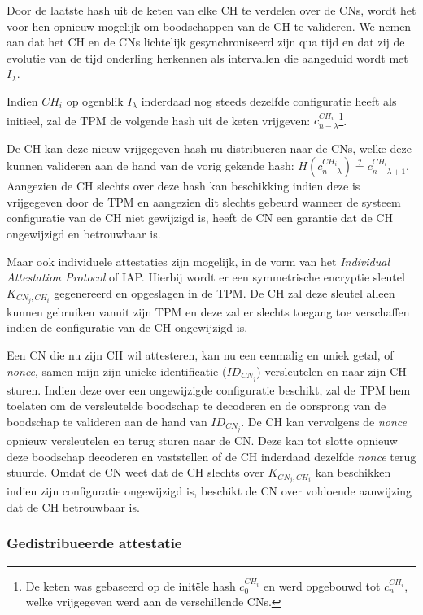 Door de laatste hash uit de keten van elke CH te verdelen over de CNs, wordt
het voor hen opnieuw mogelijk om boodschappen van de CH te valideren. We nemen
aan dat het CH en de CNs lichtelijk gesynchroniseerd zijn qua tijd en dat zij
de evolutie van de tijd onderling herkennen als intervallen die aangeduid wordt
met $I_\lambda$.

Indien $CH_i$ op ogenblik $I_\lambda$ inderdaad nog steeds dezelfde
configuratie heeft als initieel, zal de TPM de volgende hash uit de keten
vrijgeven: $c_{n-\lambda}^{CH_i}$\footnote{De keten was gebaseerd op de
init\"ele hash $c_0^{CH_i}$ en werd opgebouwd tot $c_n^{CH_i}$, welke
vrijgegeven werd aan de verschillende CNs.}.

De CH kan deze nieuw vrijgegeven hash nu distribueren naar de CNs, welke deze
kunnen valideren aan de hand van de vorig gekende hash:
$H(c_{n-\lambda}^{CH_i}) \overset{?}{=} c_{n-\lambda+1}^{CH_i}$. Aangezien de
CH slechts over deze hash kan beschikking indien deze is vrijgegeven door de
TPM en aangezien dit slechts gebeurd wanneer de systeem configuratie van de CH
niet gewijzigd is, heeft de CN een garantie dat de CH ongewijzigd en
betrouwbaar is.

Maar ook individuele attestaties zijn mogelijk, in de vorm van het
\emph{Individual Attestation Protocol} of IAP. Hierbij wordt er een
symmetrische encryptie sleutel $K_{CN_j,CH_i}$ gegenereerd en opgeslagen in de
TPM. De CH zal deze sleutel alleen kunnen gebruiken vanuit zijn TPM en deze zal
er slechts toegang toe verschaffen indien de configuratie van de CH ongewijzigd
is.

Een CN die nu zijn CH wil attesteren, kan nu een eenmalig en uniek getal, of
\emph{nonce}, samen mijn zijn unieke identificatie ($ID_{CN_j}$) versleutelen
en naar zijn CH sturen. Indien deze over een ongewijzigde configuratie
beschikt, zal de TPM hem toelaten om de versleutelde boodschap te decoderen en
de oorsprong van de boodschap te valideren aan de hand van $ID_{CN_j}$. De CH
kan vervolgens de \emph{nonce} opnieuw versleutelen en terug sturen naar de CN.
Deze kan tot slotte opnieuw deze boodschap decoderen en vaststellen of de CH
inderdaad dezelfde \emph{nonce} terug stuurde. Omdat de CN weet dat de CH
slechts over $K_{CN_j,CH_i}$ kan beschikken indien zijn configuratie
ongewijzigd is, beschikt de CN over voldoende aanwijzing dat de CH betrouwbaar
is.

\subsubsection*{Gedistribueerde attestatie}


